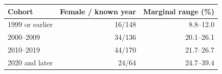 \begin{tabular}{lrr}
\toprule
Cohort & Female / known year & Marginal range (\%) \\
\midrule
1999 or earlier & 16/148 & 8.8--12.0 \\
2000--2009 & 34/136 & 20.1--26.1 \\
2010--2019 & 44/170 & 21.7--26.7 \\
2020 and later & 24/64 & 24.7--39.4 \\
\bottomrule
\end{tabular}
